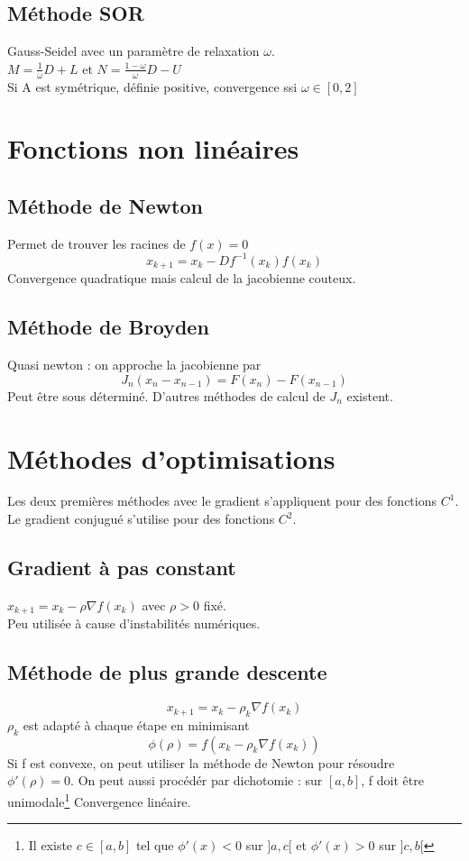 \documentclass[12pt]{report}
\begin{document}
\subsection{M\'ethode SOR}
Gauss-Seidel avec un param\`etre de relaxation $\omega$.\\
$M=\frac{1}{\omega}D+L$ et $N=\frac{1-\omega}{\omega}D-U$\\
Si A est sym\'etrique, d\'efinie positive, convergence ssi $\omega \in [0,2]$


\section{Fonctions non lin\'eaires}
\subsection{M\'ethode de Newton}
Permet de trouver les racines de $f(x)=0$
$$x_{k+1} = x_k-Df^{-1}(x_k) f(x_k)$$
Convergence quadratique mais calcul de la jacobienne couteux.
\subsection{M\'ethode de Broyden}
Quasi newton : on approche la jacobienne par
$$J_n(x_n-x_{n-1}) = F(x_n)-F(x_{n-1}) $$
Peut \^etre sous d\'etermin\'e. D'autres m\'ethodes de calcul de $J_n$ existent.

\section{M\'ethodes d'optimisations}
Les deux premi\`eres m\'ethodes avec le gradient s'appliquent pour des fonctions
$C^1$. Le gradient conjugu\'e s'utilise pour des fonctions $C^2$.
\subsection{Gradient \`a pas constant}
$x_{k+1} = x_k - \rho \nabla f(x_k)$ avec $\rho > 0$ fix\'e.\\
Peu utilis\'ee \`a cause d'instabilit\'es num\'eriques.

\subsection{M\'ethode de plus grande descente}
$$x_{k+1} = x_k - \rho_k \nabla f(x_k)$$ 
$\rho_k$ est adapt\'e \`a chaque \'etape en minimisant 
$$\phi(\rho)=f(x_k - \rho_k \nabla f(x_k))$$
Si f est convexe, on peut utiliser la m\'ethode de Newton pour r\'esoudre
$\phi'(\rho)=0$. 
On peut aussi proc\'ed\'er par dichotomie : sur $[a,b]$, f doit \^etre
unimodale\footnote{Il existe $c \in [a,b]$ tel que
$\phi'(x) < 0$ sur $]a,c[$ et 
$\phi'(x) > 0$ sur $]c,b[$}
Convergence lin\'eaire.
\end{document}

